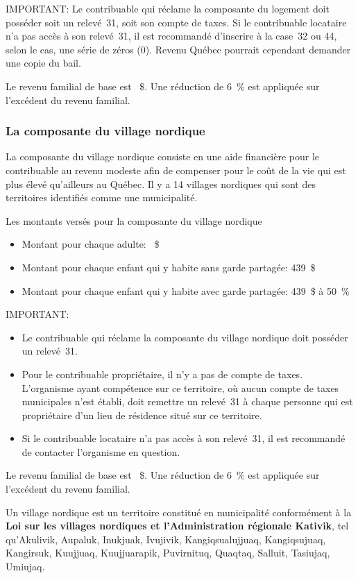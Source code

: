 IMPORTANT: Le contribuable qui réclame la composante du logement doit posséder soit un relevé~31, soit son compte de taxes. Si le contribuable locataire n'a pas accès à son relevé~31, il est recommandé d'inscrire à la case~32 ou 44, selon le cas, une série de zéros (0). Revenu Québec pourrait cependant demander une copie du bail.

Le revenu familial de base est ~\$. Une réduction de 6~\% est appliquée sur l'excédent du revenu familial.


\subsubsection{La composante du village nordique}
La composante du village nordique consiste en une aide financière pour le contribuable au revenu modeste afin de compenser pour le coût de la vie qui est plus élevé qu'ailleurs au Québec. Il y a 14 villages nordiques qui sont des territoires identifiés comme une municipalité.

Les montants versés pour la composante du village nordique
\begin{itemize}
	\item Montant pour chaque adulte: ~\$ 	
	\item Montant pour chaque enfant qui y habite sans garde partagée: 439~\$
	\item Montant pour chaque enfant qui y habite avec garde partagée: 439~\$ à 50~\%
\end{itemize}

IMPORTANT:
\begin{itemize}
	\item Le contribuable qui réclame la composante du village nordique doit posséder un relevé~31. 
	\item Pour le contribuable propriétaire, il n'y a pas de compte de taxes. L'organisme ayant compétence sur ce territoire, où aucun compte de taxes municipales n'est établi, doit remettre un relevé~31 à chaque personne qui est propriétaire d'un lieu de résidence situé sur ce territoire. 
	\item Si le contribuable locataire n'a pas accès à son relevé~31, il est recommandé de contacter l'organisme en question.
\end{itemize}

Le revenu familial de base est ~\$. Une réduction de 6~\% est appliquée sur l'excédent du revenu familial.

Un village nordique est un territoire constitué en municipalité conformément à la \textbf{Loi sur les villages nordiques et l'Administration régionale Kativik}, tel qu'Akulivik, Aupaluk, Inukjuak, Ivujivik, Kangiqsualujjuaq, Kangiqsujuaq, Kangirsuk, Kuujjuaq, Kuujjuarapik, Puvirnituq, Quaqtaq, Salluit, Tasiujaq, Umiujaq.


